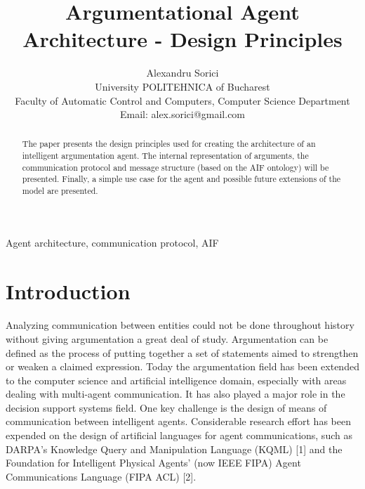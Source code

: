 \documentclass[twoside, 11pt, a4paper]{article}
\begin{document}
\title{Argumentational Agent Architecture - Design Principles}

\author{\name Alexandru Sorici\\
       \addr University POLITEHNICA of Bucharest\\
       Faculty of Automatic Control and Computers, Computer Science Department\\
       \email Email: alex.sorici@gmail.com}

\maketitle

\begin{abstract}
The paper presents the design principles used for creating the architecture of an intelligent argumentation agent.
The internal representation of arguments, the communication protocol and message structure (based on the AIF ontology)
will be presented. Finally, a simple use case for the agent and possible future extensions of the model
are presented.
\end{abstract}

\begin{keywords}
Agent architecture, communication protocol, AIF
\end{keywords}

\section{Introduction}

\paragraph*{}
Analyzing communication between entities could not be done throughout history without giving argumentation a great deal of study. 
Argumentation can be defined as the process of putting together a set of statements aimed to strengthen or weaken a claimed expression.
Today the argumentation field has been extended to the computer science and artificial intelligence domain,  especially with areas dealing with multi-agent communication. It has also played a major role in the decision support systems field.
One key challenge is the design of means of communication between intelligent agents. 
Considerable research effort has been expended on the design of artificial languages for agent communications,  such as DARPA's Knowledge Query and Manipulation Language (KQML) [1] and the 
Foundation for Intelligent Physical Agents' (now IEEE FIPA) Agent Communications Language (FIPA ACL) [2].
\end{document}
